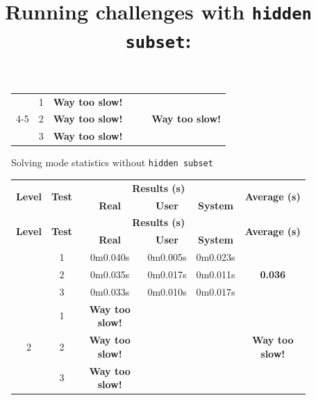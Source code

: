 \documentclass[a4paper, 11pt]{article}
\begin{document}
\begin{figure}[h]
\begin{longtable}{|c|c|c|c|c|c|}
        \multirow{3}{*}{4-5} & 1 & \textbf{Way too slow!} & & & \multirow{3}{*}{\textbf{Way too slow!}} \\
        \cline{2-5}
        & 2 & \textbf{Way too slow!} & & & \\
        \cline{2-5}
        & 3 & \textbf{Way too slow!} & & & \\
        \hline
    \end{longtable}
    \caption{Solving mode statistics without \texttt{hidden subset}}
\end{figure}

\title{Running challenges with \texttt{hidden subset}:}
\begin{figure}[h]
    \centering
    \begin{longtable}{|c|c|c|c|c|c|}
        \hline
        \multirow{2}{*}{\textbf{Level}} & \multirow{2}{*}{\textbf{Test}} & \multicolumn{3}{c|}{\textbf{Results (s)}} & \multirow{2}{*}{\textbf{Average (s)}} \\
        \cline{3-5}
        & & \textbf{Real} & \textbf{User} & \textbf{System} & \\
        \hline
        \endfirsthead
        \hline
        \multirow{2}{*}{\textbf{Level}} & \multirow{2}{*}{\textbf{Test}} & \multicolumn{3}{c|}{\textbf{Results (s)}} & \multirow{2}{*}{\textbf{Average (s)}} \\
        \cline{3-5}
        & & \textbf{Real} & \textbf{User} & \textbf{System} & \\
        \hline
        \endhead
        \hline
        \endfoot

        \multirow{3}{*}{1} & 1 & 0m0.040s & 0m0.005s & 0m0.023s & \multirow{3}{*}{\textbf{0.036}} \\
        \cline{2-5}
        & 2 & 0m0.035s & 0m0.017s & 0m0.011s & \\
        \cline{2-5}
        & 3 & 0m0.033s & 0m0.010s & 0m0.017s & \\
        \hline

        \multirow{3}{*}{2} & 1 & \textbf{Way too slow!} & & & \multirow{3}{*}{\textbf{Way too slow!}} \\
        \cline{2-5}
        & 2 & \textbf{Way too slow!} & & & \\
        \cline{2-5}
        & 3 & \textbf{Way too slow!} & & & \\
        \hline


\end{longtable}
\end{figure}
\end{document}

